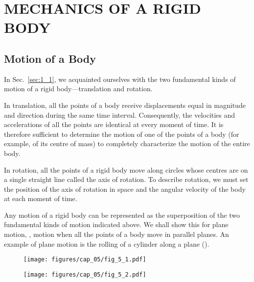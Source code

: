 

\chapter{MECHANICS OF A RIGID BODY}\label{chap:5}

\section{Motion of a Body}\label{sec:5_1}

In Sec.~\ref{sec:1_1}, we acquainted ourselves with the two fundamental kinds of motion of a rigid body---translation and rotation.

In translation, all the points of a body receive displacements equal in magnitude and direction during the same time interval. Consequently, the velocities and accelerations of all the points are identical at every moment of time. It is therefore sufficient to determine the motion of one of the points of a body (for example, of its centre of mass) to completely characterize the motion of the entire body.

In rotation, all the points of a rigid body move along circles whose centres are on a single straight line called the axis of rotation. To describe rotation, we must set the position of the axis of rotation in space and the angular velocity of the body at each moment of time.

Any motion of a rigid body can be represented as the superposition of the two fundamental kinds of motion indicated above. We shall show this for plane motion, \ie, motion when all the points of a body move in parallel planes. An example of plane motion is the rolling of a cylinder along a plane ().

\begin{figure}[t]
	\begin{minipage}[t]{0.5\linewidth}
		\begin{center}
			\texttt{[image: figures/cap\_05/fig\_5\_1.pdf]}
			\caption[]{}
			\label{fig:5_1}
		\end{center}
	\end{minipage}
	\hspace{-0.05cm}
	\begin{minipage}[t]{0.5\linewidth}
		\begin{center}
			\texttt{[image: figures/cap\_05/fig\_5\_2.pdf]}
			\caption[]{}
			\label{fig:5_2}
		\end{center}
	\end{minipage}
\vspace{-0.7cm}
\end{figure}

